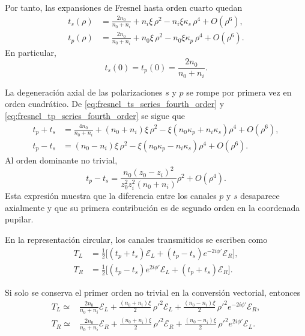 Por tanto, las expansiones de Fresnel hasta orden cuarto quedan
\begin{align}
t_s(\rho)
&=
\frac{2n_0}{n_0+n_i}
+
n_i\xi\,\rho^2
-
n_i\xi\kappa_s\,\rho^4
+
O(\rho^6),
\label{eq:fresnel_ts_series_fourth_order}
\\[6pt]
t_p(\rho)
&=
\frac{2n_0}{n_0+n_i}
+
n_0\xi\,\rho^2
-
n_0\xi\kappa_p\,\rho^4
+
O(\rho^6).
\label{eq:fresnel_tp_series_fourth_order}
\end{align}
En particular,
\begin{equation}
t_s(0)=t_p(0)=\frac{2n_0}{n_0+n_i}.
\label{eq:fresnel_axis_degeneracy}
\end{equation}

La degeneración axial de las polarizaciones \(s\) y \(p\) se rompe por primera vez en orden cuadrático. De \eqref{eq:fresnel_ts_series_fourth_order} y \eqref{eq:fresnel_tp_series_fourth_order} se sigue que
\begin{align}
t_p+t_s
&=
\frac{4n_0}{n_0+n_i}
+
(n_0+n_i)\xi\,\rho^2
-
\xi(n_0\kappa_p+n_i\kappa_s)\rho^4
+
O(\rho^6),
\label{eq:tp_plus_ts_series_fourth_order}
\\[8pt]
t_p-t_s
&=
(n_0-n_i)\xi\,\rho^2
-
\xi(n_0\kappa_p-n_i\kappa_s)\rho^4
+
O(\rho^6).
\label{eq:tp_minus_ts_series_fourth_order}
\end{align}
Al orden dominante no trivial,
\begin{equation}
t_p-t_s
=
\frac{
n_0(z_0-z_i)^2
}{
z_0^2z_i^2(n_0+n_i)
}
\rho^2
+
O(\rho^4).
\label{eq:tp_minus_ts_quadratic_explicit}
\end{equation}
Esta expresión muestra que la diferencia entre los canales \(p\) y \(s\) desaparece axialmente y que su primera contribución es de segundo orden en la coordenada pupilar.

En la representación circular, los canales transmitidos se escriben como
\begin{align}
T_L
&=
\frac{1}{2}
\big[
(t_p+t_s)\mathscr E_L
+
(t_p-t_s)e^{-2i\phi'}\mathscr E_R
\big],
\label{eq:TL_exact_circular}
\\[6pt]
T_R
&=
\frac{1}{2}
\big[
(t_p-t_s)e^{2i\phi'}\mathscr E_L
+
(t_p+t_s)\mathscr E_R
\big].
\label{eq:TR_exact_circular}
\end{align}

Si solo se conserva el primer orden no trivial en la conversión vectorial, entonces
\begin{align}
T_L
\simeq{}&
\frac{2n_0}{n_0+n_i}\mathscr E_L
+
\frac{(n_0+n_i)\xi}{2}\,\rho'^2\mathscr E_L
+
\frac{(n_0-n_i)\xi}{2}\,\rho'^2e^{-2i\phi'}\mathscr E_R,
\label{eq:TL_second_order_corrected}
\\[8pt]
T_R
\simeq{}&
\frac{2n_0}{n_0+n_i}\mathscr E_R
+
\frac{(n_0+n_i)\xi}{2}\,\rho'^2\mathscr E_R
+
\frac{(n_0-n_i)\xi}{2}\,\rho'^2e^{2i\phi'}\mathscr E_L.
\label{eq:TR_second_order_corrected}
\end{align}

